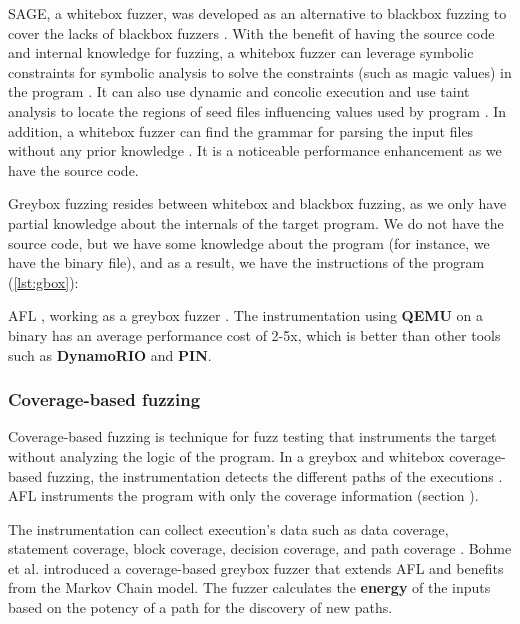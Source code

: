 SAGE, a whitebox fuzzer, was developed as an alternative to blackbox fuzzing to cover the lacks of blackbox fuzzers \cite{godefroid2012sage}. With the benefit of having the source code and internal knowledge for fuzzing, a whitebox fuzzer can leverage symbolic constraints for symbolic analysis to solve the constraints (such as magic values) in the program \cite{cadar2011symbolic}. It can also use dynamic and concolic execution \cite{stephens2016driller} and use taint analysis to locate the regions of seed files influencing values used by program \cite{ganesh2009taint}. In addition, a whitebox fuzzer can find the grammar for parsing the input files without any prior knowledge \cite{godefroid2008grammar}. It is a noticeable performance enhancement as we have the source code.

\vspace{1.5\baselineskip}

Greybox fuzzing resides between whitebox and blackbox fuzzing, as we only have partial knowledge about the internals of the target program. We do not have the source code, but we have some knowledge about the program (for instance, we have the binary file), and as a result, we have the instructions of the program (\ref{lst:gbox}):



AFL , working as a greybox fuzzer \cite{afl_qemu}. The instrumentation using \textbf{QEMU} on a binary has an average performance cost of 2-5x, which is better than other tools such as \textbf{DynamoRIO} and \textbf{PIN}.

\subsubsection*{Coverage-based fuzzing}

Coverage-based fuzzing is technique for fuzz testing that instruments the target without analyzing the logic of the program. In a greybox and whitebox coverage-based fuzzing, the instrumentation detects the different paths of the executions \cite{liang2018fuzzing}. AFL instruments the program with only the coverage information (section ).

The instrumentation can collect execution's data such as data coverage, statement coverage, block coverage, decision coverage, and path coverage \cite{yang2009survey}. Bohme et al. \cite{bohme2017coverage} introduced a coverage-based greybox fuzzer that extends AFL and benefits from the Markov Chain model. The fuzzer calculates the \textbf{energy} of the inputs based on the potency of a path for the discovery of new paths.

